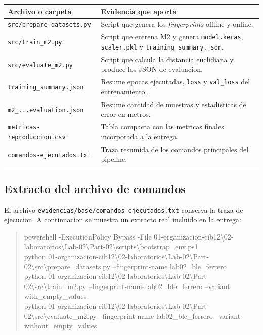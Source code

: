 \documentclass[11pt,a4paper]{article}
\begin{document}
\begin{center}
\small
\begin{tabular}{>{\raggedright\arraybackslash}p{3.9cm}p{9.0cm}}
\toprule
Archivo o carpeta & Evidencia que aporta \\
\midrule
\texttt{src/prepare\_datasets.py} & Script que genera los \textit{fingerprints} offline y online. \\
\texttt{src/train\_m2.py} & Script que entrena M2 y genera \texttt{model.keras}, \texttt{scaler.pkl} y \texttt{training\_summary.json}. \\
\texttt{src/evaluate\_m2.py} & Script que calcula la distancia euclidiana y produce los JSON de evaluacion. \\
\texttt{training\_summary.json} & Resume epocas ejecutadas, \texttt{loss} y \texttt{val\_loss} del entrenamiento. \\
\texttt{m2\_...evaluation.json} & Resume cantidad de muestras y estadisticas de error en metros. \\
\texttt{metricas-reproduccion.csv} & Tabla compacta con las metricas finales incorporada a la entrega. \\
\texttt{comandos-ejecutados.txt} & Traza resumida de los comandos principales del pipeline. \\
\bottomrule
\end{tabular}
\end{center}

\subsection*{Extracto del archivo de comandos}
El archivo \texttt{evidencias/base/comandos-ejecutados.txt} conserva la traza de ejecucion. A continuacion se muestra un extracto real incluido en la entrega:

\begin{quote}
\ttfamily\footnotesize
powershell -ExecutionPolicy Bypass -File 01-organizacion-cib12\textbackslash 02-laboratorios\textbackslash Lab-02\textbackslash Part-02\textbackslash scripts\textbackslash bootstrap\_env.ps1\\
python 01-organizacion-cib12\textbackslash 02-laboratorios\textbackslash Lab-02\textbackslash Part-02\textbackslash src\textbackslash prepare\_datasets.py --fingerprint-name lab02\_ble\_ferrero\\
python 01-organizacion-cib12\textbackslash 02-laboratorios\textbackslash Lab-02\textbackslash Part-02\textbackslash src\textbackslash train\_m2.py --fingerprint-name lab02\_ble\_ferrero --variant with\_empty\_values\\
python 01-organizacion-cib12\textbackslash 02-laboratorios\textbackslash Lab-02\textbackslash Part-02\textbackslash src\textbackslash evaluate\_m2.py --fingerprint-name lab02\_ble\_ferrero --variant without\_empty\_values
\end{quote}
\end{document}
